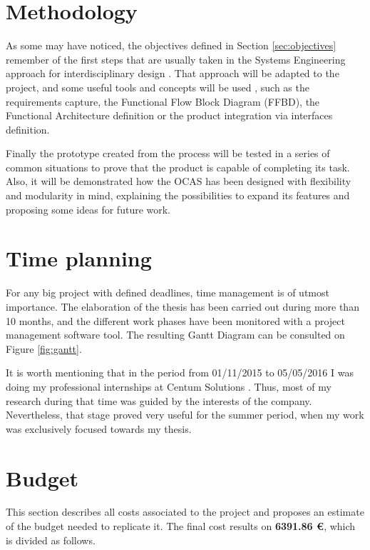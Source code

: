 \section{Methodology}

As some may have noticed, the objectives defined in Section \ref{sec:objectives} remember of the first steps that are usually taken in the Systems Engineering approach for interdisciplinary design \cite{whatissystemsengineering}.
That approach will be adapted to the project, and some useful tools and concepts will be used \cite{nationalaeronauticsandspaceadministration2007}, such as the requirements capture, the Functional Flow Block Diagram (FFBD), the Functional Architecture definition or the product integration via interfaces definition.

Finally the prototype created from the process will be tested in a series of common situations to prove that the product is capable of completing its task.
Also, it will be demonstrated how the OCAS has been designed with flexibility and modularity in mind, explaining the possibilities to expand its features and proposing some ideas for future work.

\section{Time planning}

For any big project with defined deadlines, time management is of utmost importance.
The elaboration of the thesis has been carried out during more than 10 months, and the different work phases have been monitored with a project management software tool.
The resulting Gantt Diagram can be consulted on Figure \ref{fig:gantt}.



It is worth mentioning that in the period from 01/11/2015 to 05/05/2016 I was doing my professional internships at Centum Solutions \cite{melgosa2016}.
Thus, most of my research during that time was guided by the interests of the company.
Nevertheless, that stage proved very useful for the summer period, when my work was exclusively focused towards my thesis.

\section{Budget}

This section describes all costs associated to the project and proposes an estimate
of the budget needed to replicate it. The final cost results on \textbf{6391.86 \euro}, which is divided as follows.

